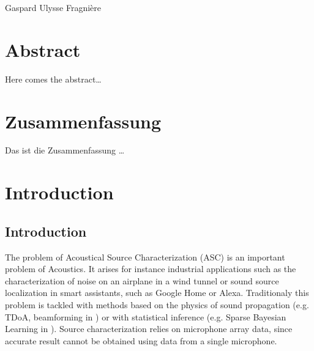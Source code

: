 \documentclass[11pt,a4paper,twoside]{report}
\begin{document}
\vspace{19mm}
\noindent
Gaspard Ulysse Fragnière \null

\cleardoublepage

\thispagestyle{empty}
\chapter*{Abstract}

Here comes the abstract\ldots

\clearpage

\thispagestyle{empty}
\german
\chapter*{Zusammenfassung}

Das ist die Zusammenfassung \ldots

\english
\cleardoublepage

\pagestyle{fancy}
\renewcommand{\chaptermark}[1]{\markboth{#1}{}}
\renewcommand{\sectionmark}[1]{\markright{\thesection\ #1}}
\fancyhead{}

\fancyhead[LO]{\scshape \contentsname}
\fancyhead[RE]{\scshape \contentsname}
\tableofcontents

\cleardoublepage

\setcounter{chapter}{0}
\setcounter{figure}{0}
\fancyhead[LO]{\rightmark}
\fancyhead[RO]{\scshape \chaptername\ \thechapter}
\fancyhead[LE]{\scshape \chaptername\ \thechapter}
\fancyhead[RE]{\textsc{\leftmark}}


\chapter{Introduction}

\section{Introduction}

The problem of Acoustical Source Characterization (ASC) is an important problem  of Acoustics. It arises for instance industrial applications such as the characterization of noise on an airplane in a wind tunnel or sound source localization in smart assistants, such as Google Home or Alexa. Traditionaly this problem is tackled with methods based on the physics of sound propagation (e.g. TDoA, beamforming in \cite{merino2019review}) or with statistical inference (e.g. Sparse Bayesian Learning in \cite{gerstoft2016multisnapshot}). Source characterization relies on microphone array data, since accurate result cannot be obtained using data from a single microphone. 
\end{document}
